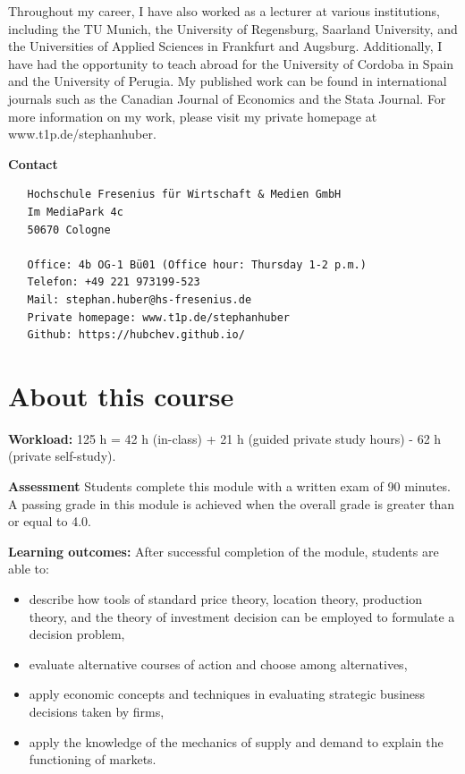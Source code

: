 \documentclass[
  12pt,
  oneside]{book}
\providecommand{\tightlist}{%
  \setlength{\itemsep}{0pt}\setlength{\parskip}{0pt}}
\theoremstyle{definition}
\theoremstyle{definition}
\theoremstyle{definition}
\theoremstyle{definition}
\theoremstyle{remark}
\begin{document}
Throughout my career, I have also worked as a lecturer at various institutions, including the TU Munich, the University of Regensburg, Saarland University, and the Universities of Applied Sciences in Frankfurt and Augsburg. Additionally, I have had the opportunity to teach abroad for the University of Cordoba in Spain and the University of Perugia. My published work can be found in international journals such as the Canadian Journal of Economics and the Stata Journal. For more information on my work, please visit my private homepage at www.t1p.de/stephanhuber.

\textbf{Contact}

\begin{verbatim}
   Hochschule Fresenius für Wirtschaft & Medien GmbH
   Im MediaPark 4c
   50670 Cologne
   
   Office: 4b OG-1 Bü01 (Office hour: Thursday 1-2 p.m.)
   Telefon: +49 221 973199-523
   Mail: stephan.huber@hs-fresenius.de
   Private homepage: www.t1p.de/stephanhuber
   Github: https://hubchev.github.io/
\end{verbatim}

\hypertarget{about-this-course}{%
\section*{About this course}\label{about-this-course}}

\textbf{Workload:}
125 h = 42 h (in-class) + 21 h (guided private study hours) - 62 h (private self-study).

\textbf{Assessment}
Students complete this module with a written exam of 90 minutes. A passing grade in this module is achieved when the overall grade is greater than or equal to 4.0.

\textbf{Learning outcomes:}
After successful completion of the module, students are able to:

\begin{itemize}
\tightlist
\item
  describe how tools of standard price theory, location theory, production theory, and the theory of investment decision can be employed to formulate a decision problem,
\item
  evaluate alternative courses of action and choose among alternatives,
\item
  apply economic concepts and techniques in evaluating strategic business decisions taken by firms,
\item
  apply the knowledge of the mechanics of supply and demand to explain the functioning of markets.
\end{itemize}
\end{document}
